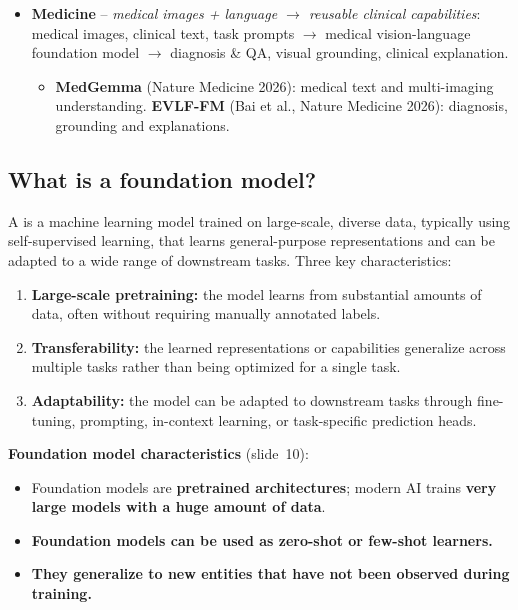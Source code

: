 \begin{itemize}
\begin{itemize}
        protein language models.
    \end{itemize}
  \item \textbf{Medicine} -- \emph{medical images + language $\to$ reusable clinical
    capabilities}: medical images, clinical text, task prompts $\to$ medical
    vision-language foundation model $\to$ diagnosis \& QA, visual grounding, clinical
    explanation.
    \begin{itemize}
      \item \textbf{MedGemma} (Nature Medicine 2026): medical text and multi-imaging
        understanding. \textbf{EVLF-FM} (Bai et al., Nature Medicine 2026): diagnosis,
        grounding and explanations.
    \end{itemize}
\end{itemize}

\subsection{What is a foundation model?}\label{sec:lec15-def}

\begin{definition}\label{def:lec15-fm}
  A  is a machine learning model trained on large-scale, diverse
  data, typically using self-supervised learning, that learns general-purpose
  representations and can be adapted to a wide range of downstream tasks. Three key
  characteristics:
  \begin{enumerate}[label=\arabic*.]
    \item \textbf{Large-scale pretraining:} the model learns from substantial amounts of
      data, often without requiring manually annotated labels.
    \item \textbf{Transferability:} the learned representations or capabilities
      generalize across multiple tasks rather than being optimized for a single task.
    \item \textbf{Adaptability:} the model can be adapted to downstream tasks through
      fine-tuning, prompting, in-context learning, or task-specific prediction heads.
  \end{enumerate}
\end{definition}

\textbf{Foundation model characteristics} (slide~10):
\begin{itemize}
  \item Foundation models are \textbf{pretrained architectures}; modern AI trains
    \textbf{very large models with a huge amount of data}.
  \item \textbf{Foundation models can be used as zero-shot or few-shot learners.}
  \item \textbf{They generalize to new entities that have not been observed during
    training.}
\end{itemize}

